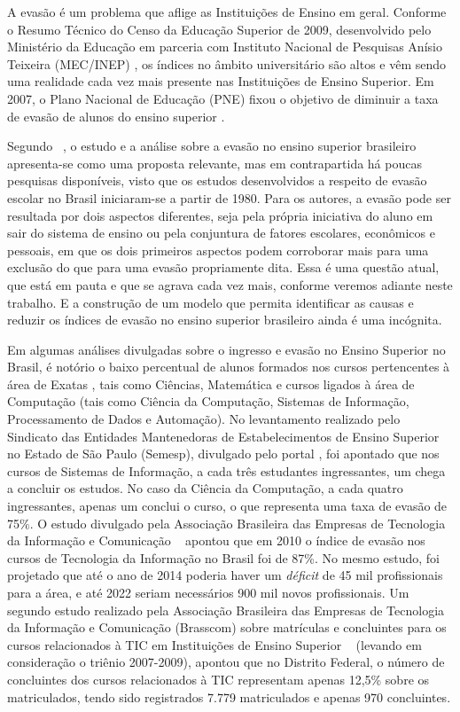 A evasão é um problema que aflige as Instituições de Ensino em geral. Conforme o Resumo Técnico do Censo da Educação Superior de 2009, desenvolvido pelo Ministério da Educação em parceria com Instituto Nacional de Pesquisas Anísio Teixeira (MEC/INEP) \citep{censo_2009}, os índices no âmbito universitário são altos e vêm sendo uma realidade cada vez mais presente nas Instituições de Ensino Superior. Em 2007, o Plano Nacional de Educação (PNE) fixou o objetivo de diminuir a taxa de evasão de alunos do ensino superior \citep{dias2010}.

Segundo ~\citet{braga2003}, o estudo e a análise sobre a evasão no ensino superior brasileiro apresenta-se  como uma proposta relevante, mas em contrapartida há poucas pesquisas disponíveis, visto que os estudos desenvolvidos a respeito de evasão escolar no Brasil iniciaram-se a partir de 1980. Para os autores, a evasão pode ser resultada por dois aspectos diferentes, seja pela própria iniciativa do aluno em sair do sistema de ensino ou pela conjuntura de fatores escolares, econômicos e pessoais, em que os dois primeiros aspectos podem corroborar mais para uma exclusão do que para uma evasão propriamente dita. Essa é uma questão atual, que está em pauta e que se agrava cada vez mais, conforme veremos adiante neste trabalho. E a construção de um modelo que permita identificar as causas e reduzir os índices de evasão no ensino superior brasileiro ainda é uma incógnita.

Em algumas análises divulgadas sobre o ingresso e evasão no Ensino Superior no Brasil, é notório o baixo percentual de alunos formados nos cursos pertencentes à área de Exatas \citep{censo2013}, tais como Ciências, Matemática e cursos ligados à área de Computação (tais como Ciência da Computação, Sistemas de Informação, Processamento de Dados e Automação). No levantamento  realizado pelo Sindicato das Entidades Mantenedoras de Estabelecimentos de Ensino Superior no Estado de São Paulo (Semesp), divulgado pelo portal  \citet{portalg1}, foi apontado que nos cursos de Sistemas de Informação, a cada três estudantes ingressantes, um chega a concluir os estudos. No caso da Ciência da Computação, a cada quatro ingressantes, apenas um conclui o curso, o que representa uma taxa de evasão de 75\%. O estudo divulgado pela Associação Brasileira das Empresas de Tecnologia da Informação e Comunicação ~\citep{brasscom} apontou que em 2010 o índice de evasão nos cursos de Tecnologia da Informação no Brasil foi de 87\%. No mesmo estudo, foi projetado que até o ano de 2014 poderia haver um \textit{déficit} de 45 mil profissionais para a área, e até 2022 seriam necessários 900 mil novos profissionais. Um segundo estudo realizado pela Associação Brasileira das Empresas de Tecnologia da Informação e Comunicação (Brasscom) sobre matrículas e concluintes para os cursos relacionados à TIC em Instituições de Ensino Superior ~\citep{brasscom2} (levando em consideração o triênio 2007-2009), apontou que no Distrito Federal, o número de concluintes dos cursos relacionados à TIC representam apenas 12,5\% sobre os matriculados, tendo sido registrados 7.779 matriculados e apenas 970 concluintes.

